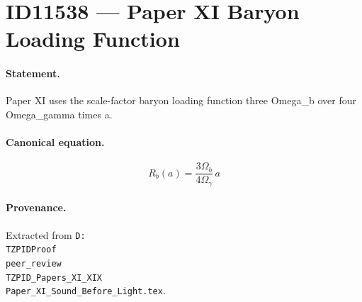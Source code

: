 \section*{ID11538 --- Paper XI Baryon Loading Function}

\paragraph{Statement.}
Paper XI uses the scale-factor baryon loading function three Omega_b over four Omega_gamma times a.

\paragraph{Canonical equation.}
\[
R_b(a)=\frac{3\Omega_b}{4\Omega_\gamma}\,a
\]

\paragraph{Provenance.}
Extracted from \texttt{D:\\TZPIDProof\\peer\_review\\TZPID\_Papers\_XI\_XIX\\Paper\_XI\_Sound\_Before\_Light.tex}.
